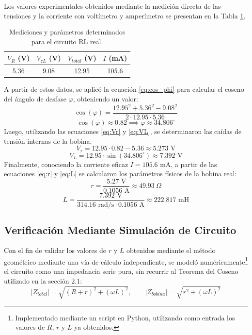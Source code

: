 Los valores experimentales obtenidos mediante la medición directa de las tensiones y la corriente con voltímetro y amperímetro se presentan en la Tabla \ref{tab:parteB}.

\begin{table}[h!]
\centering
\caption{Mediciones y parámetros determinados para el circuito RL real.}
\label{tab:parteB}
\begin{tabular}{cccc}
\toprule
$V_R$ (V) & $V_{zL}$ (V) & $V_{total}$ (V) & $I$ (mA) \\
\midrule
5.36 & 9.08 & 12.95 & 105.6 \\
\bottomrule
\end{tabular}
\end{table}

A partir de estos datos, se aplicó la ecuación \ref{eq:cos_phi} para calcular el coseno del ángulo de desfase $\varphi$, obteniendo un valor:
\begin{equation}\cos(\varphi) = \frac{12.95^2 + 5.36^2 - 9.08^2}{2 \cdot 12.95 \cdot 5.36}
\end{equation}
\begin{equation}\cos(\varphi) \approx 0.82 \implies \varphi \approx 34.806^\circ\end{equation}
Luego, utilizando las ecuaciones \ref{eq:Vr} y \ref{eq:VL}, se determinaron las caídas de tensión internas de la bobina:
\begin{equation}V_r = 12.95 \cdot 0.82 - 5.36 \approx 5.273\text{ V}\end{equation}
\begin{equation}V_L = 12.95 \cdot \sin(34.806^\circ) \approx 7.392\text{ V}\end{equation}
Finalmente, conociendo la corriente eficaz $I = 105.6\text{ mA}$, a partir de las ecuaciones \ref{eq:r} y \ref{eq:L} se calcularon los parámetros físicos de la bobina real:
\begin{equation}r = \frac{5.27\text{ V}}{0.1056\text{ A}} \approx 49.93\ \Omega\end{equation}
\begin{equation}L = \frac{7.392\text{ V}}{314.16\text{ rad/s} \cdot 0.1056\text{ A}} \approx 222.817\text{ mH}\end{equation}

\subsection{Verificación Mediante Simulación de Circuito}

Con el fin de validar los valores de $r$ y $L$ obtenidos mediante el método geométrico mediante una vía de cálculo independiente, se modeló numéricamente\footnote{Implementado mediante un script en Python, utilizando como entrada los valores de $R$, $r$ y $L$ ya obtenidos.} el circuito como una impedancia serie pura, sin recurrir al Teorema del Coseno utilizado en la sección 2.1:
\begin{equation}
|Z_{total}| = \sqrt{(R+r)^2 + (\omega L)^2}, \qquad |Z_{bobina}| = \sqrt{r^2 + (\omega L)^2}
\label{eq:zsim}
\end{equation}

